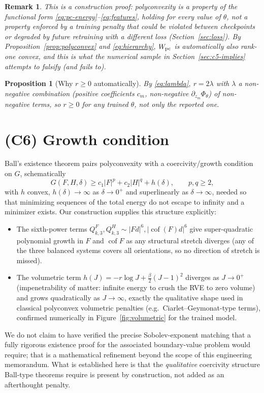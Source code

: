\documentclass[10pt,a4paper]{article}
\newtheorem{proposition}{Proposition}
\newtheorem{remark}{Remark}
\newcommand{\Cof}{\operatorname{cof}}
\begin{document}
\begin{remark}
This is a construction proof: polyconvexity is a property of the
functional form \eqref{eq:pc-energy}--\eqref{eq:features}, holding for
\emph{every} value of $\theta$, not a property enforced by a training
penalty that could be violated between checkpoints or degraded by future
retraining with a different loss (Section~\ref{sec:loss}). By
Proposition~\ref{prop:polyconvex} and \eqref{eq:hierarchy}, $W_{\rm pc}$
is automatically also rank-one convex, and this is what the numerical
sample in Section~\ref{sec:c5-implies} attempts to falsify (and fails
to).
\end{remark}

\begin{proposition}[Why $r\geq0$ automatically]
By \eqref{eq:lambda}, $r=2\lambda$ with $\lambda$ a non-negative
combination (positive coefficients $c_m$, non-negative $\partial_{z_m}
\Phi_\theta$) of non-negative terms, so $r\geq0$ for \emph{any} trained
$\theta$, not only the reported one.
\end{proposition}

\section{(C6) Growth condition}
\label{sec:c6}
Ball's existence theorem pairs polyconvexity with a coercivity/growth
condition on $G$, schematically
\begin{equation}
 G(F,H,\delta)\geq c_1|F|^p+c_2|H|^q+h(\delta),\qquad p,q\geq2,
\end{equation}
with $h$ convex, $h(\delta)\to\infty$ as $\delta\to0^+$ and superlinearly
as $\delta\to\infty$, needed so that minimizing sequences of the total
energy do not escape to infinity and a minimizer exists. Our construction
supplies this structure explicitly:
\begin{itemize}
\item The sixth-power terms $Q_{k,3}^F,Q_{k,3}^H\sim|Fd|^6,|\Cof(F)d|^6$
give super-quadratic polynomial growth in $F$ and $\Cof F$ as any
structural stretch diverges (any of the three balanced systems covers
all orientations, so no direction of stretch is missed).
\item The volumetric term $h(J)=-r\log J+\tfrac\beta2(J-1)^2$ diverges as
$J\to0^+$ (impenetrability of matter: infinite energy to crush the RVE to
zero volume) and grows quadratically as $J\to\infty$, exactly the
qualitative shape used in classical polyconvex volumetric penalties
(e.g.\ Ciarlet--Geymonat-type terms), confirmed numerically in
Figure~\ref{fig:volumetric} for the trained model.
\end{itemize}
We do not claim to have verified the precise Sobolev-exponent matching
that a fully rigorous existence proof for the associated boundary-value
problem would require; that is a mathematical refinement beyond the scope
of this engineering memorandum. What is established here is that the
\emph{qualitative} coercivity structure Ball-type theorems require is
present by construction, not added as an afterthought penalty.
\end{document}
